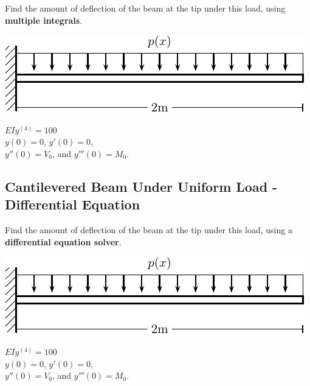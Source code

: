 \newpage

\problem Find the amount of deflection of the beam at the tip under
this load, using {\bf multiple integrals}.

\begin{minipage}[t]{0.5\linewidth}
\vspace{0pt}
\includegraphics[width=1.0\linewidth]{graphics/notes_09_beams1}
\end{minipage}
\hfill
\begin{minipage}[t]{0.45\linewidth}
\vspace{0pt}
$EI y^{(4)} = 100$ \\
$y(0) = 0$, $y'(0) = 0$,  \\
$y''(0) = V_0$, and $y'''(0) = M_0$.
\end{minipage}

\newpage
{}  
\subsection{Cantilevered Beam Under Uniform Load - Differential Equation}  

\problem Find the amount of deflection of the beam at the tip under
this load, using a {\bf differential equation solver}.

\begin{minipage}[t]{0.5\linewidth}
\vspace{0pt}
\includegraphics[width=1.0\linewidth]{graphics/notes_09_beams1}

\end{minipage}
\begin{minipage}[t]{0.5\linewidth}
\vspace{0pt}
$EI y^{(4)} = 100$ \\
$y(0) = 0$, $y'(0) = 0$,  \\
$y''(0) = V_0$, and $y'''(0) = M_0$.
\end{minipage}

